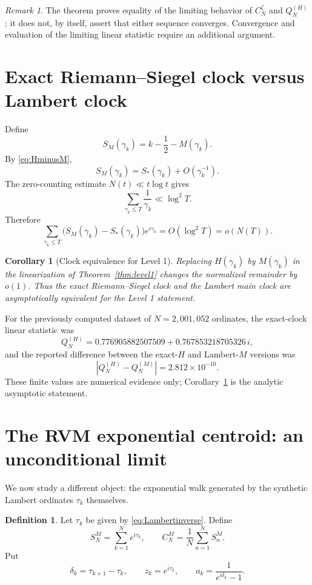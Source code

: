 \documentclass[11pt]{article}
\newtheorem{corollary}[theorem]{Corollary}
\theoremstyle{definition}
\newtheorem{definition}[theorem]{Definition}
\theoremstyle{remark}
\newtheorem{remark}[theorem]{Remark}
\begin{document}
\begin{remark}
The theorem proves equality of the limiting behavior of $C_N^{\zeta}$ and $Q_N^{(H)}$; it does not, by itself, assert that either sequence converges.  Convergence and evaluation of the limiting linear statistic require an additional argument.
\end{remark}

\section{Exact Riemann--Siegel clock versus Lambert clock}\label{sec:clockequiv}

Define
\[
S_M(\gamma_k)=k-\frac12-M(\gamma_k).
\]
By \eqref{eq:HminusM},
\[
S_M(\gamma_k)=S_*(\gamma_k)+O(\gamma_k^{-1}).
\]
The zero-counting estimate $N(t)\ll t\log t$ gives
\[
\sum_{\gamma_k\le T}\frac1{\gamma_k}\ll\log^2T.
\]
Therefore
\begin{equation}\label{eq:HMphase}
\sum_{\gamma_k\le T}
\bigl(S_M(\gamma_k)-S_*(\gamma_k)\bigr)e^{i\gamma_k}
=O(\log^2T)=o(N(T)).
\end{equation}

\begin{corollary}[Clock equivalence for Level 1]\label{cor:clocklevel1}
Replacing $H(\gamma_k)$ by $M(\gamma_k)$ in the linearization of Theorem~\ref{thm:level1} changes the normalized remainder by $o(1)$.  Thus the exact Riemann--Siegel clock and the Lambert main clock are asymptotically equivalent for the Level 1 statement.
\end{corollary}

For the previously computed dataset of $N=2{,}001{,}052$ ordinates, the exact-clock linear statistic was
\[
Q_N^{(H)}
=0.776905882507509+0.767853218705326\,i,
\]
and the reported difference between the exact-$H$ and Lambert-$M$ versions was
\[
|Q_N^{(H)}-Q_N^{(M)}|=2.812\times10^{-10}.
\]
These finite values are numerical evidence only; Corollary~\ref{cor:clocklevel1} is the analytic asymptotic statement.

\section{The RVM exponential centroid: an unconditional limit}\label{sec:rvm}

We now study a different object: the exponential walk generated by the synthetic Lambert ordinates $\tau_k$ themselves.

\begin{definition}
Let $\tau_k$ be given by \eqref{eq:Lambertinverse}.  Define
\[
S_N^{M}=\sum_{k=1}^N e^{i\tau_k},\qquad
C_N^{M}=\frac1N\sum_{n=1}^N S_n^M.
\]
Put
\[
\delta_k=\tau_{k+1}-\tau_k,
\qquad
z_k=e^{i\tau_k},
\qquad
 a_k=\frac1{e^{i\delta_k}-1}.
\]
\end{definition}
\end{document}
